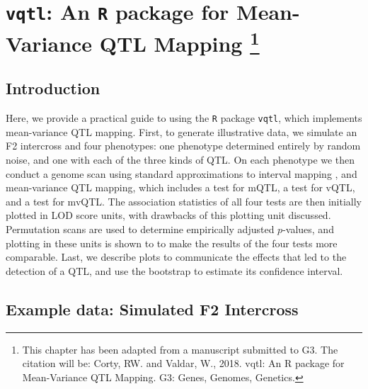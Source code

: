 \chapter[
    \texttt{vqtl}: An \texttt{R} package for Mean-Variance QTL Mapping
]
{
    \texttt{vqtl}: An \texttt{R} package for Mean-Variance QTL Mapping
    \footnote{This chapter has been adapted from a manuscript submitted to G3.
    The citation will be: Corty, RW. and Valdar, W., 2018. vqtl: An R package for Mean-Variance QTL Mapping. G3: Genes, Genomes, Genetics.}
}
\label{chap:package_vqtl}

\section{Introduction}

Here, we provide a practical guide to using the \texttt{R} package \texttt{vqtl}, which implements mean-variance QTL mapping.
First, to generate illustrative data, we simulate an F2 intercross and four phenotypes: one phenotype determined entirely by random noise, and one with each of the three kinds of QTL.
On each phenotype we then conduct a genome scan using standard approximations to interval mapping \citep{Lander1989a,Martinez1992}, and mean-variance QTL mapping, which includes a test for mQTL, a test for vQTL, and a test for mvQTL.
The association statistics of all four tests are then initially plotted in LOD score units, with drawbacks of this plotting unit discussed.
Permutation scans are used to determine empirically adjusted $p$-values, and plotting in these units is shown to to make the results of the four tests more comparable.
Last, we describe plots to communicate the effects that led to the detection of a QTL, and use the bootstrap to estimate its confidence interval.


\section{Example data: Simulated F2 Intercross}

